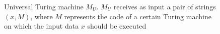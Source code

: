 \begin{figure}
\centering



\caption{Universal Turing machine $M_U$. $M_U$ receives as input
  a pair of strings $\left(x, M\right)$, where $M$ represents the code
  of a certain Turing machine on which the input data $x$ should be executed} 
\label{figAddAlgoUTuring}
\end{figure}